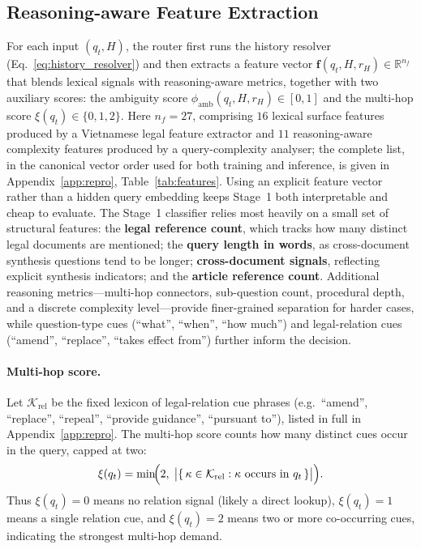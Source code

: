 \documentclass[pdflatex,sn-mathphys-num]{sn-jnl}
\begin{document}
\subsection{Reasoning-aware Feature Extraction}\label{subsec:features}

For each input $(q_t,H)$, the router first runs the history resolver
(Eq.~\ref{eq:history_resolver}) and then extracts a feature vector
$\mathbf{f}(q_t,H,r_H)\in\mathbb{R}^{n_f}$ that blends lexical signals with
reasoning-aware metrics, together with two auxiliary scores: the ambiguity
score $\phi_{\mathrm{amb}}(q_t,H,r_H)\in[0,1]$ and the multi-hop score
$\xi(q_t)\in\{0,1,2\}$.
Here $n_f=27$, comprising $16$ lexical surface features produced by a
Vietnamese legal feature extractor and $11$ reasoning-aware complexity
features produced by a query-complexity analyser; the complete list, in the
canonical vector order used for both training and inference, is given in
Appendix~\ref{app:repro}, Table~\ref{tab:features}. Using an explicit feature
vector rather than a hidden query embedding keeps Stage~1 both interpretable
and cheap to evaluate.
The Stage~1 classifier relies most heavily on a small set of structural
features: the \textbf{legal reference count}, which tracks how many distinct
legal documents are mentioned; the \textbf{query length in words}, as
cross-document synthesis questions tend to be longer;
\textbf{cross-document signals}, reflecting explicit synthesis indicators;
and the \textbf{article reference count}. Additional reasoning
metrics---multi-hop connectors, sub-question count, procedural depth, and a
discrete complexity level---provide finer-grained separation for harder
cases, while question-type cues (``what'', ``when'', ``how much'') and
legal-relation cues (``amend'', ``replace'', ``takes effect from'') further
inform the decision.

\paragraph{Multi-hop score.}
Let $\mathcal{K}_{\mathrm{rel}}$ be the fixed lexicon of legal-relation cue
phrases (e.g.\ ``amend'', ``replace'', ``repeal'', ``provide guidance'',
``pursuant to''), listed in full in Appendix~\ref{app:repro}. The multi-hop
score counts how many distinct cues occur in the query, capped at two:
\begin{equation}
\xi(q_t)=\min\!\Bigl(2,\;\bigl|\{\,\kappa\in\mathcal{K}_{\mathrm{rel}} : \kappa\ \text{occurs in}\ q_t\,\}\bigr|\Bigr).
\label{eq:multihop_score}
\end{equation}
Thus $\xi(q_t)=0$ means no relation signal (likely a direct lookup),
$\xi(q_t)=1$ means a single relation cue, and $\xi(q_t)=2$ means two or more
co-occurring cues, indicating the strongest multi-hop demand.
\end{document}
